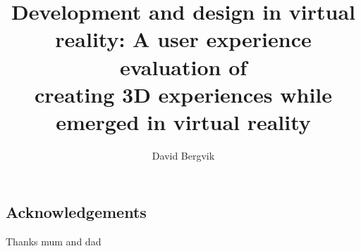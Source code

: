 \documentclass[a4paper,11pt,twoside]{report}
\title{Development and design in virtual reality: A user experience evaluation of \\creating 3D experiences while emerged in virtual reality }%
\author{David Bergvik}
\begin{document}
\maketitle


\begin{center}
\section*{Acknowledgements}
Thanks mum and dad 
\end{center}

\clearpage

\end{document}
